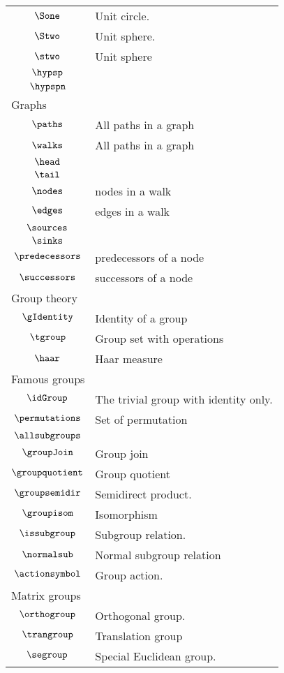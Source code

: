 \begin{longtable}{cl}
 \hline
$\Sone$ &  Unit circle.\\ 
 $\Stwo$ &  Unit sphere.\\ 
 $\stwo$ &  Unit sphere\\ 
 $\hypsp$ & \\ 
 $\hypspn$ & \\ 
 \multicolumn{2}{l}{Graphs}\\ 
 \hline
\hline
$\paths$ &  All paths in a graph\\ 
 $\walks$ &  All paths in a graph\\ 
 $\head$ & \\ 
 $\tail$ & \\ 
 $\nodes$ &  nodes in a walk\\ 
 $\edges$ &  edges in a walk\\ 
 $\sources$ & \\ 
 $\sinks$ & \\ 
 $\predecessors$ &  predecessors of a node\\ 
 $\successors$ &  successors of a node\\ 
 \multicolumn{2}{l}{Group theory}\\ 
 \hline
$\gIdentity$ &  Identity of a group\\ 
 $\tgroup$ &  Group set with operations\\ 
 $\haar$ &  Haar measure\\ 
 \multicolumn{2}{l}{Famous groups}\\ 
 \hline
$\idGroup$ &  The trivial group with identity only.\\ 
 $\permutations$ &  Set of permutation\\ 
 $\allsubgroups$ & \\ 
 $\groupJoin$ &  Group join\\ 
 $\groupquotient$ &  Group quotient\\ 
 $\groupsemidir$ &  Semidirect product.\\ 
 $\groupisom$ &  Isomorphism\\ 
 $\issubgroup$ &  Subgroup relation.\\ 
 $\normalsub$ &  Normal subgroup relation\\ 
 $\actionsymbol$ &  Group action.\\ 
 \multicolumn{2}{l}{Matrix groups}\\ 
 \hline
$\orthogroup$ &  Orthogonal group.\\ 
 $\trangroup$ &   Translation group\\ 
 $\segroup$ &  Special Euclidean group.\\ 

\end{longtable}
